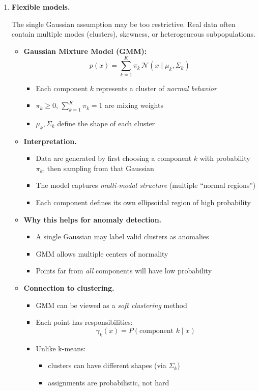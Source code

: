 \documentclass{article}
\begin{document}
\begin{enumerate}
\item \textbf{Flexible models.}

The single Gaussian assumption may be too restrictive. Real data often contain multiple modes (clusters), skewness, or heterogeneous subpopulations.

\begin{itemize}
    \item \textbf{Gaussian Mixture Model (GMM):}
    \[
    p(x) = \sum_{k=1}^K \pi_k \,\mathcal{N}(x \mid \mu_k, \Sigma_k)
    \]

    \begin{itemize}
        \item Each component \(k\) represents a cluster of \emph{normal behavior}
        \item \( \pi_k \ge 0 \), \( \sum_{k=1}^K \pi_k = 1 \) are mixing weights
        \item \( \mu_k, \Sigma_k \) define the shape of each cluster
    \end{itemize}

    \item \textbf{Interpretation.}
    \begin{itemize}
        \item Data are generated by first choosing a component \(k\) with probability \( \pi_k \), then sampling from that Gaussian
        \item The model captures \emph{multi-modal structure} (multiple “normal regions”)
        \item Each component defines its own ellipsoidal region of high probability
    \end{itemize}

    \item \textbf{Why this helps for anomaly detection.}
    \begin{itemize}
        \item A single Gaussian may label valid clusters as anomalies
        \item GMM allows multiple centers of normality
        \item Points far from \emph{all} components will have low probability
    \end{itemize}

    \item \textbf{Connection to clustering.}
    \begin{itemize}
        \item GMM can be viewed as a \emph{soft clustering} method
        \item Each point has responsibilities:
        \[
        \gamma_k(x) = P(\text{component } k \mid x)
        \]
        \item Unlike k-means:
        \begin{itemize}
            \item clusters can have different shapes (via \( \Sigma_k \))
            \item assignments are probabilistic, not hard
        \end{itemize}
    \end{itemize}


\end{itemize}
\end{enumerate}
\end{document}
